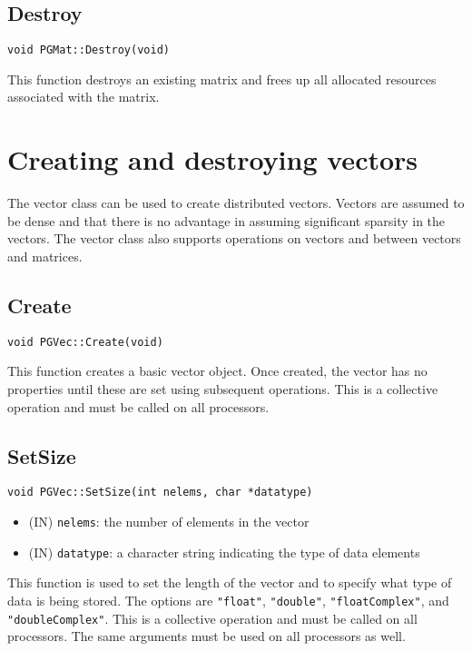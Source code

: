 \documentclass[12pt]{article}
\begin{document}
\subsection{Destroy}
\begin{verbatim}
void PGMat::Destroy(void)
\end{verbatim}
This function destroys an existing matrix and frees up all allocated resources
associated with the matrix.

\section{Creating and destroying vectors}
The vector class can be used to create distributed vectors. Vectors are assumed
to be dense and that there is no advantage in assuming significant sparsity in
the vectors. The vector class also supports operations on vectors and between
vectors and matrices.
\subsection{Create}
\begin{verbatim}
void PGVec::Create(void)
\end{verbatim}
This function creates a basic vector object. Once created, the vector has no
properties until these are set using subsequent operations. This is a collective
operation and must be called on all processors.
\subsection{SetSize}
\begin{verbatim}
void PGVec::SetSize(int nelems, char *datatype)
\end{verbatim}
\begin{itemize}
\item (IN) \texttt{nelems}: the number of elements in the vector
\item (IN) \texttt{datatype}: a character string indicating the type of data
elements
\end{itemize}
This function is used to set the length of the vector and to specify what
type of data is being stored. The options are \texttt{"float"},
\texttt{"double"}, \texttt{"floatComplex"}, and \texttt{"doubleComplex"}. This
is a collective operation and must be called on all processors. The same
arguments must be used on all processors as well.
\end{document}
